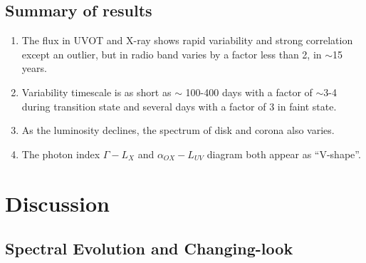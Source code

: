 \documentclass[twocolumn]{aastex63}
\begin{document}
\subsection{Summary of results}
\begin{enumerate}
\item The flux in UVOT and X-ray shows rapid variability and strong correlation except an outlier, but in radio band varies by a factor less than 2, in $\sim$15 years. 

\item Variability timescale is as short as $\sim$ 100-400 days with a factor of $\sim$3-4 during transition state and several days with a factor of 3 in faint state.

\item As the luminosity declines, the spectrum of disk and corona also varies.

\item The photon index $\Gamma-L_{X}$ and $\alpha_{OX}-L_{UV}$ diagram both appear as ``V-shape''. 


\end{enumerate}






\section{Discussion}\label{sec:discussion}
\subsection{Spectral Evolution and Changing-look}
\end{document}
